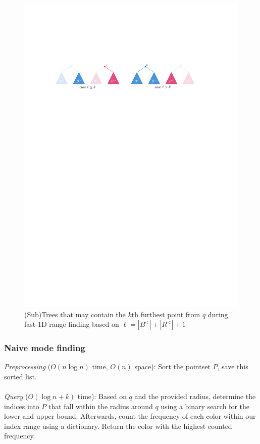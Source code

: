 \documentclass{article}
\newcommand{\fb}[1]{{\color{blue}#1}}
\begin{document}
\begin{figure}%
    \centering
    \includegraphics[width=12cm]{figs/opt_rank.pdf}
    \caption{\fb{(Sub)Trees that may contain the $k$th furthest point from $q$ during fast 1D range finding based on $\ell = |B^<| + |R^<| + 1$}}%
    \label{fig:vanderHorst_treesplit}%
\end{figure}
\subsubsection{Naive mode finding}
\textit{Preprocessing} ($O(n \log n)$ time, $O(n)$ space): \fb{Sort the pointset $P$, save this sorted list.} \\\\
\textit{Query} ($O(\log n + k)$ time): \fb{Based on $q$ and the provided radius, determine the indices into $P$ that fall within the radius around $q$ using a binary search for the lower and upper bound. Afterwards, count the frequency of each color within our index range using a dictionary. Return the color with the highest counted frequency.}
\end{document}
